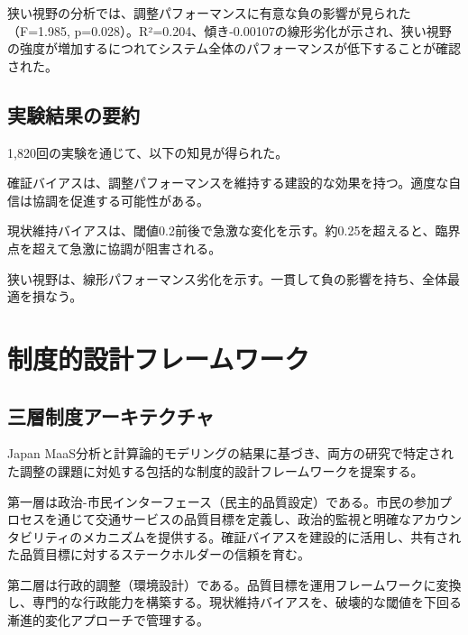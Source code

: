 狭い視野の分析では、調整パフォーマンスに有意な負の影響が見られた（F=1.985, p=0.028）。R²=0.204、傾き-0.00107の線形劣化が示され、狭い視野の強度が増加するにつれてシステム全体のパフォーマンスが低下することが確認された。

\subsection{実験結果の要約}

1,820回の実験を通じて、以下の知見が得られた。

確証バイアスは、調整パフォーマンスを維持する建設的な効果を持つ。適度な自信は協調を促進する可能性がある。

現状維持バイアスは、閾値0.2前後で急激な変化を示す。約0.25を超えると、臨界点を超えて急激に協調が阻害される。

狭い視野は、線形パフォーマンス劣化を示す。一貫して負の影響を持ち、全体最適を損なう。

\section{制度的設計フレームワーク}
\label{sec:ch4_design}

\subsection{三層制度アーキテクチャ}

Japan MaaS分析と計算論的モデリングの結果に基づき、両方の研究で特定された調整の課題に対処する包括的な制度的設計フレームワークを提案する。

第一層は政治-市民インターフェース（民主的品質設定）である。市民の参加プロセスを通じて交通サービスの品質目標を定義し、政治的監視と明確なアカウンタビリティのメカニズムを提供する。確証バイアスを建設的に活用し、共有された品質目標に対するステークホルダーの信頼を育む。

第二層は行政的調整（環境設計）である。品質目標を運用フレームワークに変換し、専門的な行政能力を構築する。現状維持バイアスを、破壊的な閾値を下回る漸進的変化アプローチで管理する。

